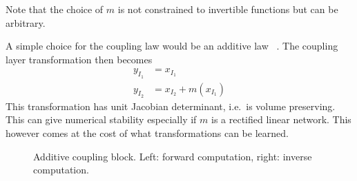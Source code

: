 Note that the choice of $m$ is not constrained to invertible functions but can
be arbitrary.

A simple choice for the coupling law would be an additive law
~\citep{dinhNICENonlinearIndependent2015, gomezReversibleResidualNetwork2017}.
The coupling layer transformation then becomes
\begin{equation}
    \begin{aligned}%
        \label{eq:add_coupling_transform}
        y_{I_1} &= x_{I_1} \\
        y_{I_2} &= x_{I_2} + m(x_{I_1})
    \end{aligned}
\end{equation}
This transformation has unit Jacobian determinant, i.e.\ is volume preserving.
This can give numerical stability especially if $m$ is a rectified linear
network. This however comes at the cost of what transformations can be learned.

\begin{figure}[htpb]
    \centering
    \begin{subfigure}[t]{0.8\textwidth}
        \centering
    \end{subfigure}
    \par\bigskip
    \begin{subfigure}[b]{0.8\textwidth}
        \centering
    \end{subfigure}
\caption{Additive coupling block. Left: forward computation, right: inverse
computation.}%
\label{fig:additive_coupling_block}
\end{figure}

